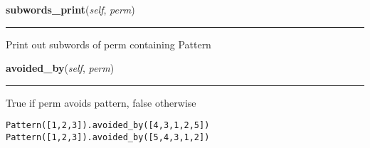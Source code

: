 \hspace{.8\funcindent}\begin{boxedminipage}{\funcwidth}

    \raggedright \textbf{subwords\_print}(\textit{self}, \textit{perm})

    \vspace{-1.5ex}

    \rule{\textwidth}{0.5\fboxrule}
\setlength{\parskip}{2ex}
    Print out subwords of perm containing Pattern

\setlength{\parskip}{1ex}
    \end{boxedminipage}

    \label{script-avoids2_spyx:Pattern:avoided_by}

    \vspace{0.5ex}

\hspace{.8\funcindent}\begin{boxedminipage}{\funcwidth}

    \raggedright \textbf{avoided\_by}(\textit{self}, \textit{perm})

    \vspace{-1.5ex}

    \rule{\textwidth}{0.5\fboxrule}
\setlength{\parskip}{2ex}
    True if perm avoids pattern, false otherwise

\begin{alltt}
\pysrcprompt{{\textgreater}{\textgreater}{\textgreater} }Pattern([1,2,3]).avoided\_by([4,3,1,2,5])
\pysrcoutput{}\pysrcprompt{{\textgreater}{\textgreater}{\textgreater} }Pattern([1,2,3]).avoided\_by([5,4,3,1,2])
\end{alltt}
\setlength{\parskip}{1ex}
    \end{boxedminipage}

    \label{script-avoids2_spyx:Pattern:avoiders}

    \vspace{0.5ex}

